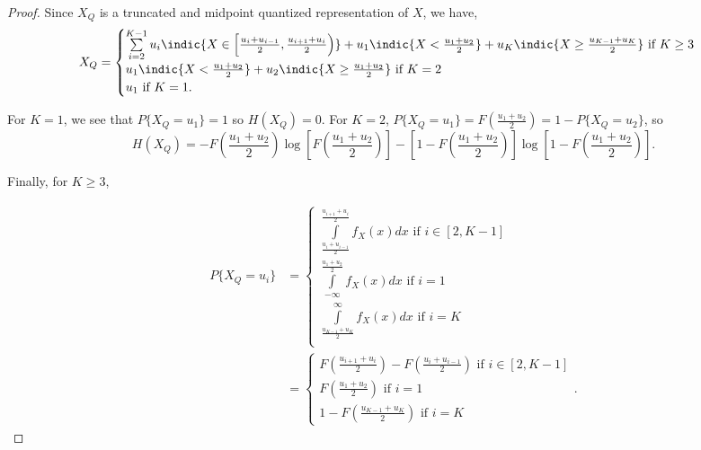 \documentclass[12pt,onecolumn, margin=1in]{IEEEtran}
\newcommand{\bracket}[1]{\left[ #1 \right]}
\newcommand{\paren}[1]{\left( #1 \right)}
\begin{document}
\begin{proof}
Since $X_Q$ is a truncated and midpoint quantized representation of $X$, we have,
\begin{equation}
    X_Q = \begin{cases}
    \sum\limits_{i = 2}^{K-1} u_i\indic{X \in \left[\frac{u_{i} + u_{i-1}}{2},\frac{u_{i+1} + u_i}{2}\right)} + u_1\indic{X < \frac{u_1 + u_2}{2}} + u_K\indic{X \geq \frac{u_{K-1} + u_K}{2}} \text{ if } K \geq 3\\
    u_1\indic{X < \frac{u_1 + u_2}{2}} + u_2\indic{X \geq \frac{u_1 + u_2}{2}} \text{ if } K = 2\\
    u_1 \text{ if } K = 1.
    \end{cases}
\end{equation}

For $K = 1$, we see that $P\{X_Q = u_1\} = 1$ so $H(X_Q) = 0$. For $K = 2$, $P\{X_Q = u_1\} = F\paren{\frac{u_1 + u_2}{2}} = 1 - P\{X_Q = u_2\}$, so 
\begin{equation}
H(X_Q) = -F\paren{\frac{u_1 + u_2}{2}}\log\bracket{F\paren{\frac{u_1 + u_2}{2}}} - \bracket{1 -  F\paren{\frac{u_1 + u_2}{2}}}\log\bracket{1 -  F\paren{\frac{u_1 + u_2}{2}}}.
\end{equation}

Finally, for $K \geq 3$,

\begin{equation}
\begin{aligned}
    P\{X_Q = u_i\} &=  \begin{cases} \int\limits_{\frac{u_{i} + u_{i-1}}{2}}^{\frac{u_{i+1} + u_i}{2}} f_X(x)dx \text{ if } i \in [2, K-1]\\
    \int\limits_{-\infty}^{\frac{u_1 + u_2}{2}} f_X(x)dx \text{ if }  i = 1\\
    \int\limits_{\frac{u_{K-1} + u_K}{2}}^{\infty} f_X(x)dx \text{ if }  i = K\\ 
    \end{cases}\\
    &=\begin{cases} F\paren{\frac{u_{i+1} + u_i}{2}} - F\paren{\frac{u_{i} + u_{i-1}}{2}} \text{ if } i \in [2, K-1]\\
    F\paren{\frac{u_1 + u_2}{2}}  \text{ if } i = 1\\
    1 - F\paren{\frac{u_{K-1} + u_K}{2}} \text{ if } i = K
    \end{cases}.
\end{aligned}
\end{equation}


\end{proof}
\end{document}

